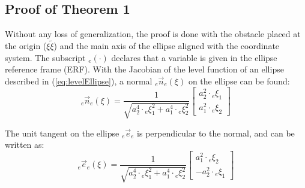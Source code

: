\appendix
\subsection{Proof of Theorem 1} \label{sec:proof1}


Without any loss of generalization, the proof is done with the obstacle placed at the origin ($\xi \tilde \xi$) and the main axis of the ellipse aligned with the coordinate system. The subscript ${}_e (\cdot)$ declares that a variable is given in the ellipse reference frame (ERF).
With the Jacobian of the level function of an ellipse described in (\ref{eq:levelEllipse}), a normal ${}_e \vec n_e (\xi)$ on the ellipse can be found:
\begin{equation}
  {}_e \vec{n}_{e} (\xi) =
  \frac{1}{\sqrt{a_2^4 \cdot {}_e\xi_1^2 + a_1^4 \cdot{}_e \xi_2^2}}
  \begin{bmatrix}
    a_2^2 \cdot {}_e\xi_1 \\
    a_1^2 \cdot {}_e\xi_2
  \end{bmatrix}
\end{equation}

The unit tangent on the ellipse ${}_e\vec e_{e}$ is perpendicular to the normal, and can be written as:
\begin{equation}
  {}_e \vec{e}_{e} (\xi)=
  \frac{1}{\sqrt{a_2^4 \cdot {}_e\xi_1^2 + a_1^4 \cdot{}_e \xi_2^2}}
  \begin{bmatrix}
    a_1^2 \cdot {}_e\xi_2 \\
    - a_2^2 \cdot {}_e\xi_1
  \end{bmatrix}
\end{equation}

